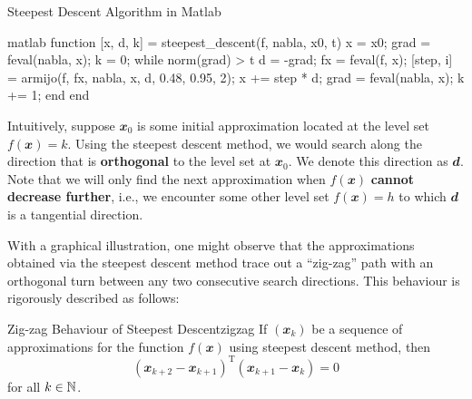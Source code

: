 \documentclass[math, code]{amznotes}
\theoremstyle{remark}
\begin{document}
\begin{codebox}{Steepest Descent Algorithm in Matlab}{}
    \begin{amzcode}{matlab}
function [x, d, k] = steepest_descent(f, nabla, x0, t)
    x = x0;
    grad = feval(nabla, x);
    k = 0;
    while norm(grad) > t
        d = -grad;
        fx = feval(f, x);
        [step, i] = armijo(f, fx, nabla, x, d, 0.48, 0.95, 2);
        x += step * d;
        grad = feval(nabla, x);
        k += 1;
    end
end
    \end{amzcode}
\end{codebox}
Intuitively, suppose $\mathbfit{x}_0$ is some initial approximation located at the level set $f(\mathbfit{x}) = k$. Using the steepest descent method, we would search along the direction that is \textbf{orthogonal} to the level set at $\mathbfit{x}_0$. We denote this direction as $\mathbfit{d}$. Note that we will only find the next approximation when $f(\mathbfit{x})$ \textbf{cannot decrease further}, i.e., we encounter some other level set $f(\mathbfit{x}) = h$ to which $\mathbfit{d}$ is a tangential direction.

With a graphical illustration, one might observe that the approximations obtained via the steepest descent method trace out a ``zig-zag'' path with an orthogonal turn between any two consecutive search directions. This behaviour is rigorously described as follows:
\begin{probox}{Zig-zag Behaviour of Steepest Descent}{zigzag}
    If $(\mathbfit{x}_k)$ be a sequence of approximations for the function $f(\mathbfit{x})$ using steepest descent method, then
    \begin{equation*}
        (\mathbfit{x}_{k + 2} - \mathbfit{x}_{k + 1})^{\mathrm{T}}(\mathbfit{x}_{k + 1} - \mathbfit{x}_k) = 0
    \end{equation*}
    for all $k \in \mathbb{N}$.
\end{probox}
\end{document}
